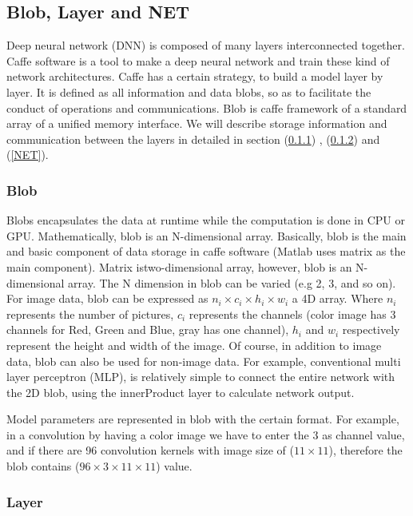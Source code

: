 \documentclass[12pt]{article}
\begin{document}
\subsection{Blob, Layer and NET}\label{Blob, Layer and NET}

Deep neural network (DNN) is composed of many layers interconnected together. Caffe software is a tool to make a deep neural network and train these kind of network architectures. Caffe has a certain strategy, to build a model layer by layer. It is defined as all information and data blobs, so as to facilitate the conduct of operations and communications. Blob is caffe framework of a standard array of a unified memory interface. We will describe storage information and communication between the layers in detailed in section (\ref{Blob}) , (\ref{Layer}) and (\ref{NET}).

\subsubsection{Blob}\label{Blob}

Blobs encapsulates the data at runtime while the computation is done in CPU or GPU. Mathematically, blob is an N-dimensional array. Basically, blob is the main and basic component of data storage in caffe software (Matlab uses matrix as the main component). Matrix is ​​two-dimensional array, however, blob is an N-dimensional array. The N dimension in blob can be varied (e.g 2, 3, and so on). For image data, blob can be expressed as $n_{i} \times c_{i} \times h_{i} \times w_{i}$ a 4D array. Where $n_{i}$ represents the number of pictures, $c_{i}$ represents the channels (color image has 3 channels for Red, Green and Blue, gray has one channel), $h_{i}$ and $w_{i}$ respectively represent the height and width of the image. Of course, in addition to image data, blob can also be used for non-image data. For example, conventional multi layer perceptron (MLP), is relatively simple to connect the entire network with the 2D blob, using the innerProduct layer to calculate network output.

Model parameters are represented in blob with the certain format. For example, in a convolution by having a color image we have to enter the 3  as channel value, and if there are 96 convolution kernels with image size of ($11 \times 11$), therefore the blob contains ($96 \times 3 \times 11 \times 11$) value.

\subsubsection{Layer}\label{Layer}
\end{document}
